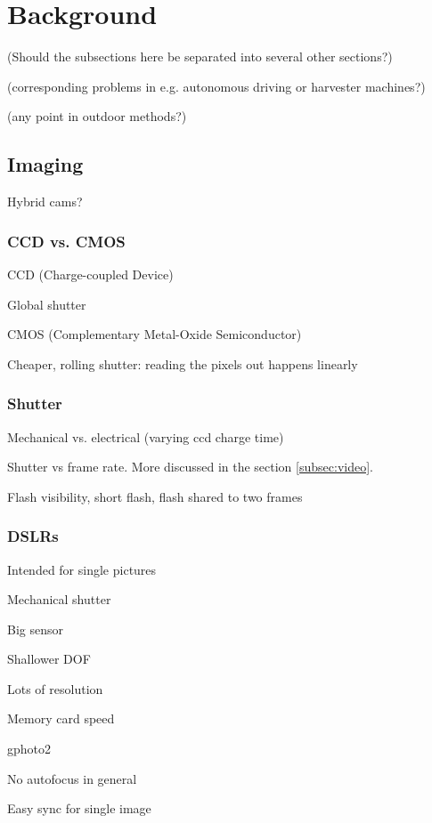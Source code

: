 \section{Background}

(Should the subsections here be separated into several other sections?)

(corresponding problems in e.g. autonomous driving or harvester machines?)

(any point in outdoor methods?)

\subsection{Imaging}

Hybrid cams?

\subsubsection{CCD vs. CMOS}

CCD (Charge-coupled Device)

Global shutter

CMOS (Complementary Metal-Oxide Semiconductor)

Cheaper, rolling shutter: reading the pixels out happens linearly

\subsubsection{Shutter}

Mechanical vs. electrical (varying ccd charge time)

Shutter vs frame rate. More discussed in the section \ref{subsec:video}.

Flash visibility, short flash, flash shared to two frames

\subsubsection{DSLRs}

Intended for single pictures

Mechanical shutter

Big sensor

Shallower DOF

Lots of resolution

Memory card speed

gphoto2

No autofocus in general

Easy sync for single image


